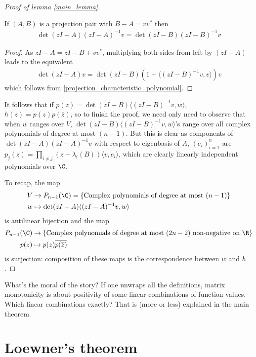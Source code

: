 \begin{proof}[Proof of lemma \ref{main_lemma}]
	\begin{lem}
		If $(A, B)$ is a projection pair with $B - A = v v^{*}$ then
		\begin{align*}
			\det(z I - A) (z I - A)^{-1} v = \det(z I - B) (z I - B)^{-1} v
		\end{align*} 
	\end{lem}
	\begin{proof}
		As $z I - A = z I - B + v v^{*}$, multiplying both sides from left by $(z I - A)$ leads to the equivalent
		\begin{align*}
			\det(z I - A) v = \det(z I - B) (1 + \langle (z I - B)^{-1} v, v \rangle) v
		\end{align*}
		which follows from \ref{projection_characteristic_polynomial}.
	\end{proof}
	It follows that if $p(z) = \det(z I - B) \langle (z I - B)^{-1} v, w \rangle$, $h(z) = p(z) \overline{p (\overline{z})}$, so to finish the proof, we need only need to observe that when $w$ ranges over $V$, $\det(z I - B) \langle (z I - B)^{-1} v, w \rangle$'s range over all complex polynomials of degree at most $(n - 1)$. But this is clear as components of $\det(z I - A)(z I - A)^{-1} v$ with respect to eigenbasis of $A$, $(e_{i})_{i = 1}^{n}$ are $p_{j}(z) = \prod_{i \neq j}(z - \lambda_{i}(B)) \langle v, e_{i} \rangle$, which are clearly linearly independent polynomials over $\C$.

	To recap, the map
	\begin{align*}
		V &\to P_{n - 1}(\C) = \{\text{Complex polynomials of degree at most } (n - 1) \} \\
		w &\mapsto \det(z I - A) \langle (z I - A)^{-1} v, w \rangle
	\end{align*}
	is antilinear bijection and the map
	\begin{align*}
		P_{n - 1}(\C) &\to \{\text{Complex polynomials of degree at most } (2 n - 2) \text{ non-negative on } \R \} \\
		p(z) &\mapsto p(z) \overline{p(\overline{z})}
	\end{align*}
	is surjection: composition of these maps is the correspondence between $w$ and $h$.
\end{proof}

What's the moral of the story? If one unwraps all the definitions, matrix monotonicity is about positivity of some linear combinations of function values. Which linear combinations exactly? That is (more or less) explained in the main theorem.

\section{Loewner's theorem}

